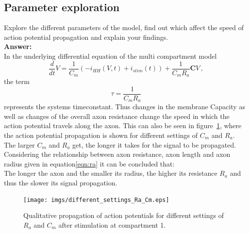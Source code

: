 \documentclass{scrartcl}			%
\begin{document}
\subsection{Parameter exploration}
Explore the different parameters of the model, find out which affect the speed of action potential propagation and explain your findings.\\
\newline
\textbf{Answer:}\\
In the underlying differential equation of the multi compartment model
\begin{equation}\label{eqn:ode}
	\frac{d}{dt} V = \frac{1}{C_m} (-i_{HH}(V, t) + i_{stim}(t)) + \frac{1}{C_m R_a} \mathbf{C} V \, ,
\end{equation}
the term 
\begin{equation}
\tau = \frac{1}{C_m R_a}
\end{equation}
 represents the systems timeconstant. Thus changes in the membrane Capacity as well as changes of the overall axon resistance change the speed in which the action potential travels along the axon. This can also be seen in figure~\ref{fig:comp3}, where the action potential propagation is shown for different settings of $C_m$ and $R_a$. The larger $C_m$ and $R_a$ get, the longer it takes for the signal to be propagated.\\
Considering the relationship between axon resistance, axon length and axon radius given in equation\ref{eqn:ra} it can be concluded that: \\The longer the axon and the smaller its radius,  the higher its resistance $R_a$ and thus the slower its signal propagation.
\begin{figure}[H]
\centering
\texttt{[image: imgs/different\_settings\_Ra\_Cm.eps]} 
    \caption{Qualitative propagation of action potentials for different settings of $R_a$ and $C_m$ after stimulation at compartment 1.} 
    \label{fig:comp3} 
\end{figure}
\end{document}
